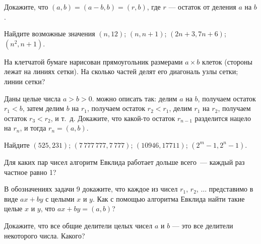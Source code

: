 \documentclass[a4paper,11pt]{article}
\begin{document}



Докажите, что $(a,b)=(a-b,b)=(r,b)$, где $r$ --- остаток
от деления $a$ на $b$.

Найдите возможные значения 
 $(n,12)$;
 $(n,n+1)$;
 $(2n+3,7n+6)$;
 $(n^2,n+1)$.

 На клетчатой бумаге нарисован прямоугольник
размерами $a\times b$
клеток (стороны лежат на линиях сетки).
На сколько частей делят его диагональ
 узлы сетки;
 линии сетки?




Даны целые числа $a>b>0$.
 можно описать так: делим $a$ на $b$,
получаем остаток $r_1<b$,
затем делим $b$ на $r_1$,
получаем остаток $r_2<r_1$,
делим $r_1$ на $r_2$,
получаем остаток $r_3<r_2$, и т.~д.
Докажите, что %
какой-то остаток $r_{n-1}$ разделится нацело на $r_n$,
и тогда $r_n=(a,b)$.

 Найдите %
$(525,231)$;
$(7\,777\,777,7\,777)$;
$(10946,17711)$;
$(2^m-1,2^n-1)$.


Для каких пар чисел алгоритм Евклида работает  дольше всего\ --- каждый раз частное равно 1?

В обозначениях задачи 9 докажите, что каждое из чисел $r_1$, $r_2$, $\dots$
представимо в виде $ax+by$ с целыми $x$ и $y$.
Как с помощью алгоритма Евклида найти такие целые %
$x$ и $y$,
что $ax+by=(a,b)$?

Докажите, что все общие делители целых чисел $a$ и $b$ --- это все делители некоторого числа.
Какого?
\end{document}
